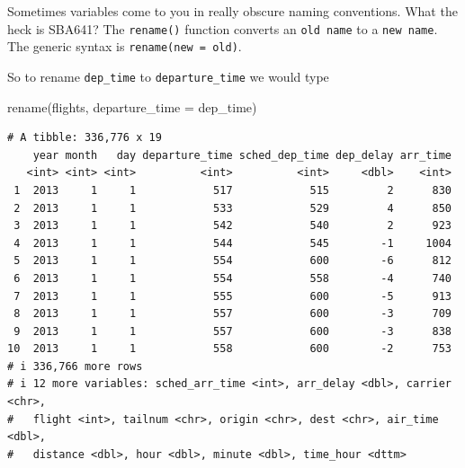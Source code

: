 \documentclass[
  letterpaper,
  DIV=11,
  numbers=noendperiod,
  oneside]{scrreprt}
\newenvironment{Shaded}{\begin{snugshade}}{\end{snugshade}}
\newcommand{\AttributeTok}[1]{\textcolor[rgb]{0.40,0.45,0.13}{#1}}
\newcommand{\FunctionTok}[1]{\textcolor[rgb]{0.28,0.35,0.67}{#1}}
\newcommand{\NormalTok}[1]{\textcolor[rgb]{0.00,0.23,0.31}{#1}}
\begin{document}
{}

Sometimes variables come to you in really obscure naming conventions.
What the heck is SBA641? The \texttt{rename()} function converts an
\texttt{old\ name} to a \texttt{new\ name}. The generic syntax is
\texttt{rename(new\ =\ old)}. {}

So to rename \texttt{dep\_time} to \texttt{departure\_time} we would
type

\begin{Shaded}
\begin{Highlighting}[]
\FunctionTok{rename}\NormalTok{(flights, }\AttributeTok{departure\_time =}\NormalTok{ dep\_time)}
\end{Highlighting}
\end{Shaded}

\begin{verbatim}
# A tibble: 336,776 x 19
    year month   day departure_time sched_dep_time dep_delay arr_time
   <int> <int> <int>          <int>          <int>     <dbl>    <int>
 1  2013     1     1            517            515         2      830
 2  2013     1     1            533            529         4      850
 3  2013     1     1            542            540         2      923
 4  2013     1     1            544            545        -1     1004
 5  2013     1     1            554            600        -6      812
 6  2013     1     1            554            558        -4      740
 7  2013     1     1            555            600        -5      913
 8  2013     1     1            557            600        -3      709
 9  2013     1     1            557            600        -3      838
10  2013     1     1            558            600        -2      753
# i 336,766 more rows
# i 12 more variables: sched_arr_time <int>, arr_delay <dbl>, carrier <chr>,
#   flight <int>, tailnum <chr>, origin <chr>, dest <chr>, air_time <dbl>,
#   distance <dbl>, hour <dbl>, minute <dbl>, time_hour <dttm>
\end{verbatim}
\end{document}
